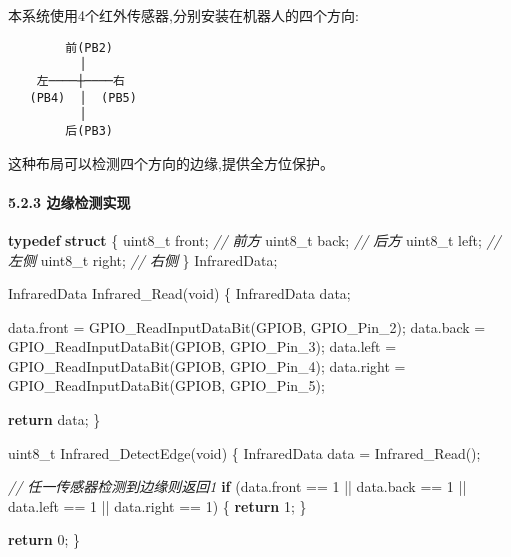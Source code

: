 \documentclass[
]{article}
\newenvironment{Shaded}{}{}
\newcommand{\CommentTok}[1]{\textcolor[rgb]{0.38,0.63,0.69}{\textit{#1}}}
\newcommand{\ControlFlowTok}[1]{\textcolor[rgb]{0.00,0.44,0.13}{\textbf{#1}}}
\newcommand{\DataTypeTok}[1]{\textcolor[rgb]{0.56,0.13,0.00}{#1}}
\newcommand{\DecValTok}[1]{\textcolor[rgb]{0.25,0.63,0.44}{#1}}
\newcommand{\KeywordTok}[1]{\textcolor[rgb]{0.00,0.44,0.13}{\textbf{#1}}}
\newcommand{\NormalTok}[1]{#1}
\begin{document}
本系统使用4个红外传感器,分别安装在机器人的四个方向:

\begin{verbatim}
        前(PB2)
          │
    左────┼────右
   (PB4)  │  (PB5)
          │
        后(PB3)
\end{verbatim}

这种布局可以检测四个方向的边缘,提供全方位保护。

\hypertarget{ux8fb9ux7f18ux68c0ux6d4bux5b9eux73b0}{%
\paragraph{5.2.3
边缘检测实现}\label{ux8fb9ux7f18ux68c0ux6d4bux5b9eux73b0}}

\begin{Shaded}
\begin{Highlighting}[]
\KeywordTok{typedef} \KeywordTok{struct}\NormalTok{ \{}
    \DataTypeTok{uint8\_t}\NormalTok{ front;   }\CommentTok{// 前方}
    \DataTypeTok{uint8\_t}\NormalTok{ back;    }\CommentTok{// 后方}
    \DataTypeTok{uint8\_t}\NormalTok{ left;    }\CommentTok{// 左侧}
    \DataTypeTok{uint8\_t}\NormalTok{ right;   }\CommentTok{// 右侧}
\NormalTok{\} InfraredData;}

\NormalTok{InfraredData Infrared\_Read(}\DataTypeTok{void}\NormalTok{)}
\NormalTok{\{}
\NormalTok{    InfraredData data;}
    
\NormalTok{    data.front = GPIO\_ReadInputDataBit(GPIOB, GPIO\_Pin\_2);}
\NormalTok{    data.back = GPIO\_ReadInputDataBit(GPIOB, GPIO\_Pin\_3);}
\NormalTok{    data.left = GPIO\_ReadInputDataBit(GPIOB, GPIO\_Pin\_4);}
\NormalTok{    data.right = GPIO\_ReadInputDataBit(GPIOB, GPIO\_Pin\_5);}
    
    \ControlFlowTok{return}\NormalTok{ data;}
\NormalTok{\}}

\DataTypeTok{uint8\_t}\NormalTok{ Infrared\_DetectEdge(}\DataTypeTok{void}\NormalTok{)}
\NormalTok{\{}
\NormalTok{    InfraredData data = Infrared\_Read();}
    
    \CommentTok{// 任一传感器检测到边缘则返回1}
    \ControlFlowTok{if}\NormalTok{ (data.front == }\DecValTok{1}\NormalTok{ || data.back == }\DecValTok{1}\NormalTok{ || }
\NormalTok{        data.left == }\DecValTok{1}\NormalTok{ || data.right == }\DecValTok{1}\NormalTok{) \{}
        \ControlFlowTok{return} \DecValTok{1}\NormalTok{;}
\NormalTok{    \}}
    
    \ControlFlowTok{return} \DecValTok{0}\NormalTok{;}
\NormalTok{\}}
\end{Highlighting}
\end{Shaded}
\end{document}
